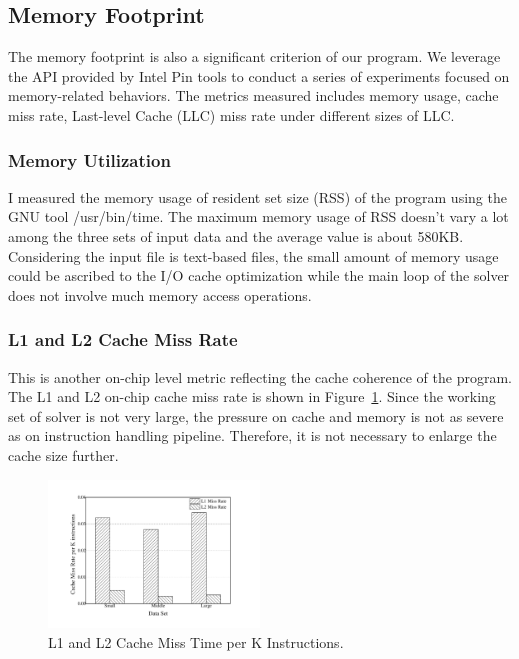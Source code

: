 \subsection{Memory Footprint}
\label{sec:memory}
The memory footprint is also a significant criterion of our program. We leverage the API provided by Intel Pin tools to conduct a series of experiments focused on memory-related behaviors. The metrics measured includes memory usage, cache miss rate, Last-level Cache (LLC) miss rate under different sizes of LLC.

\subsubsection{Memory Utilization}
I measured the memory usage of resident set size (RSS) of the program using the GNU tool /usr/bin/time. The maximum memory usage of RSS doesn't vary a lot among the three sets of input data and the average value is about 580KB. Considering the input file is text-based files, the small amount of memory usage could be ascribed to the I/O cache optimization while the main loop of the solver does not involve much memory access operations.

\subsubsection{L1 and L2 Cache Miss Rate}
This is another on-chip level metric reflecting the cache coherence of the program. The L1 and L2 on-chip cache miss rate is shown in Figure~\ref{fig:cache_miss}. Since the working set of solver is not very large, the pressure on cache and memory is not as severe as on instruction handling pipeline. Therefore, it is not necessary to enlarge the cache size further.

\begin{figure}[ht]
\centering
\includegraphics[width=0.50\textwidth]{graph/cache_miss.pdf}
\caption{L1 and L2 Cache Miss Time per K Instructions.}
\label{fig:cache_miss}
\end{figure}

